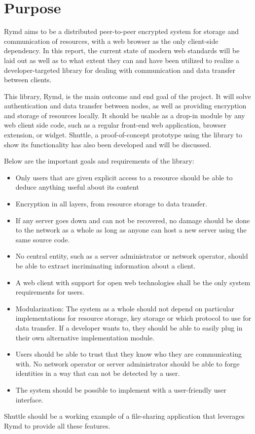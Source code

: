 \section{Purpose}
Rymd aims to be a distributed peer-to-peer encrypted system for storage and communication of resources, with a web browser as the only client-side dependency. In this report, the current state of modern web standards will be laid out as well as to what extent they can and have been utilized to realize a developer-targeted library for dealing with communication and data transfer between clients.

This library, Rymd, is the main outcome and end goal of the project. It will solve authentication and data transfer between nodes, as well as providing encryption and storage of resources locally. It should be usable as a drop-in module by any web client side code, such as a regular front-end web application, browser extension, or widget. Shuttle, a proof-of-concept prototype using the library to show its functionality has also been developed and will be discussed.

Below are the important goals and requirements of the library:
\begin{itemize}
  \item Only users that are given explicit access to a resource should be able to deduce anything useful about its content
  
  \item Encryption in all layers, from resource storage to data transfer.
  
  \item If any server goes down and can not be recovered, no damage should be done to the network as a whole as long as anyone can host a new server using the same source code.
  
  \item No central entity, such as a server administrator or network operator, should be able to extract incriminating information about a client.
  
  \item  A web client with support for open web technologies shall be the only system requirements for users.
  
  \item Modularization: The system as a whole should not depend on particular implementations for resource storage, key storage or which protocol to use for data transfer. If a developer wants to, they should be able to easily plug in their own alternative implementation module.

\item Users should be able to trust that they know who they are communicating with. No network operator or server administrator should be able to forge identities in a way that can not be detected by a user.

\item The system should be possible to implement with a user-friendly user interface.

\end{itemize}

Shuttle should be a working example of a file-sharing application that leverages Rymd to provide all these features.
